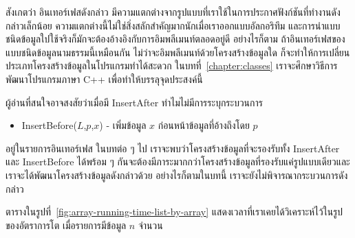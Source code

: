สังเกต{\wbr}ว่า อิน{\wbr}เทอร์เฟส{\wbr}ดังกล่าว{\wbr}
มี{\wbr}ความ{\wbr}แตกต่าง{\wbr}จาก{\wbr}รูปแบบ{\wbr}ที่{\wbr}เรา{\wbr}ใช้{\wbr}ใน{\wbr}การ{\wbr}ประกาศ{\wbr}ฟังก์ชัน{\wbr}ที่ทำงาน{\wbr}ดังกล่าว{\wbr}เล็กน้อย{\wbr}
ความ{\wbr}แตกต่าง{\wbr}นี้{\wbr}ไม่{\wbr}ใช่{\wbr}สิ่ง{\wbr}สลักสำคัญ{\wbr}มาก{\wbr}นัก{\wbr}เมื่อ{\wbr}เรา{\wbr}ออกแบบ{\wbr}อัล{\wbr}กอ{\wbr}ริ{\wbr}ทึม{\wbr}
และ{\wbr}การ{\wbr}นำ{\wbr}แบบ{\wbr}ชนิด{\wbr}ข้อมูล{\wbr}ใป{\wbr}ใช้{\wbr}จริง{\wbr}ก็{\wbr}มักจะ{\wbr}ต้อง{\wbr}อ้างอิง{\wbr}กับ{\wbr}การ{\wbr}อิม{\wbr}พลี{\wbr}เมนท์{\wbr}ตลอด{\wbr}อยู่{\wbr}ดี อย่างไรก็ตาม{\wbr}
ถ้า{\wbr}อิน{\wbr}เทอร์เฟส{\wbr}ของ{\wbr}แบบ{\wbr}ชนิด{\wbr}ข้อมูล{\wbr}นามธรรม{\wbr}นี้{\wbr}เหมือน{\wbr}กัน{\wbr}
ไม่ว่า{\wbr}จะ{\wbr}อิม{\wbr}พลี{\wbr}เมนท์{\wbr}ด้วย{\wbr}โครงสร้าง{\wbr}ข้อมูล{\wbr}ใด{\wbr}
ก็{\wbr}จะ{\wbr}ทำ{\wbr}ให้การ{\wbr}เปลี่ยน{\wbr}ประเภท{\wbr}โครงสร้าง{\wbr}ข้อมูล{\wbr}ใน{\wbr}โปรแกรม{\wbr}ทำ{\wbr}ได้{\wbr}สะดวก{\wbr}
ใน{\wbr}บท{\wbr}ที่~\ref{chapter:classes} เรา{\wbr}จะ{\wbr}ศึกษา{\wbr}วิธีการ{\wbr}พัฒนา{\wbr}โปรแกรม{\wbr}ภาษา C++
เพื่อ{\wbr}ทำ{\wbr}ให้{\wbr}บรรลุ{\wbr}จุดประสงค์{\wbr}นี้{\wbr}

ผู้อ่าน{\wbr}ที่{\wbr}สนใจ{\wbr}อาจ{\wbr}สงสัย{\wbr}ว่า{\wbr}เมื่อ{\wbr}มี InsertAfter ทำไม{\wbr}ไม่{\wbr}มี{\wbr}การ{\wbr}ระบุ{\wbr}กระบวนการ{\wbr}
\begin{itemize}
\item InsertBefore($L$,$p$,$x$) - เพิ่ม{\wbr}ข้อมูล $x$ ก่อนหน้า{\wbr}ข้อมูล{\wbr}ที่{\wbr}อ้าง{\wbr}ถึง{\wbr}โดย $p$
\end{itemize}
อยู่{\wbr}ใน{\wbr}รายการ{\wbr}อิน{\wbr}เทอร์เฟส ใน{\wbr}บท{\wbr}ต่อ ๆ ไป เรา{\wbr}จะ{\wbr}พบ{\wbr}ว่า{\wbr}โครงสร้าง{\wbr}ข้อมูล{\wbr}ที่{\wbr}จะ{\wbr}รองรับ{\wbr}ทั้ง{\wbr}
InsertAfter และ InsertBefore ได้{\wbr}พร้อม ๆ
กัน{\wbr}จะ{\wbr}ต้อง{\wbr}มี{\wbr}ภาระ{\wbr}มาก{\wbr}กว่า{\wbr}โครงสร้าง{\wbr}ข้อมูล{\wbr}ที่{\wbr}รองรับ{\wbr}แค่{\wbr}รูปแบบ{\wbr}เดียว{\wbr}และ{\wbr}เรา{\wbr}จะ{\wbr}ได้{\wbr}พัฒนา{\wbr}โครงสร้าง{\wbr}ข้อมูล{\wbr}ดังกล่าว{\wbr}ด้วย{\wbr}
อย่างไรก็ตาม{\wbr}ใน{\wbr}บท{\wbr}นี้ เรา{\wbr}จะ{\wbr}ยัง{\wbr}ไม่{\wbr}พิจารณา{\wbr}กระบวนการ{\wbr}ดังกล่าว{\wbr}

ตาราง{\wbr}ใน{\wbr}รูป{\wbr}ที่~\ref{fig:array-running-time-list-by-array}
แสดง{\wbr}เวลา{\wbr}ที่{\wbr}เรา{\wbr}เคย{\wbr}ได้{\wbr}วิเคราะห์{\wbr}ไว้{\wbr}ใน{\wbr}รูป{\wbr}ของ{\wbr}อัตรา{\wbr}การ{\wbr}โต เมื่อ{\wbr}รายการ{\wbr}มี{\wbr}ข้อมูล $n$ จำนวน{\wbr}

